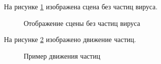На рисунке \ref{fig:simple} изображена сцена без частиц вируса.

\begin{figure}[ph!]
	\caption{Отображение сцены без частиц вируса}
	\label{fig:simple}
\end{figure}

На рисунке \ref{fig:virus_move1} изображено движение частиц.

\begin{figure}[ph!]
	\caption{Пример движения частиц}
	\label{fig:virus_move1}
\end{figure}

